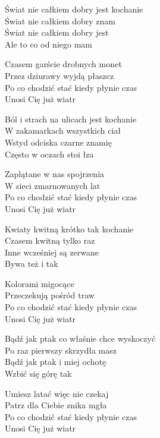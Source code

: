 \begin{text}
Świat nie całkiem dobry jest kochanie\\
Świat nie całkiem dobry znam\\
Świat nie całkiem dobry jest\\
Ale to co od niego mam

Czasem garście drobnych monet\\
Przez dziurawy wyjdą płaszcz\\
Po co chodzić stać kiedy płynie czas\\
Unosi Cię już wiatr

Ból i strach na ulicach jest kochanie\\
W zakamarkach wszystkich ciał\\
Wstyd odciska czarne znamię\\
Często w oczach stoi łza

Zaplątane w nas spojrzenia\\
W sieci zmarnowanych lat\\
Po co chodzić stać kiedy płynie czas\\
Unosi Cię już wiatr

Kwiaty kwitną krótko tak kochanie\\
Czasem kwitną tylko raz\\
Inne wcześniej są zerwane\\
Bywa też i tak

Kolorami migocące\\
Przeczekują pośród traw\\
Po co chodzić stać kiedy płynie czas\\
Unosi Cię już wiatr

Bądź jak ptak co właśnie chce wyskoczyć\\
Po raz pierwszy skrzydła masz \\
Bądź jak ptak i miej ochotę\\
Wzbić się górę tak

Umiesz latać więc nie czekaj\\
Patrz dla Ciebie znika mgła\\
Po co chodzić stać kiedy płynie czas\\
Unosi Cię już wiatr
\end{text}
